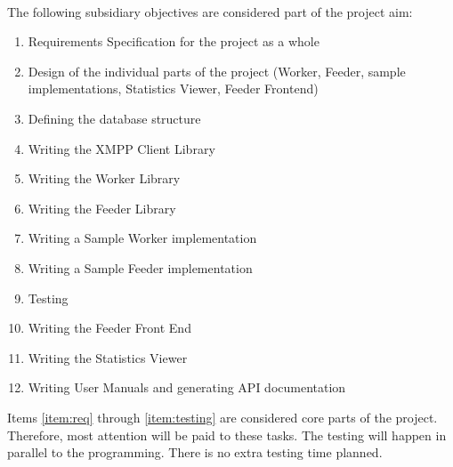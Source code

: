 \paragraph{}
The following subsidiary objectives are considered part of the project aim:
\begin{enumerate}
\item \label{item:req} Requirements Specification for the project as a whole
\item \label{item:design} Design of the individual parts of the project (Worker, Feeder, sample implementations, Statistics Viewer, Feeder Frontend)
\item \label{item:db} Defining the database structure
\item \label{item:client} Writing the XMPP Client Library
\item \label{item:worker} Writing the Worker Library
\item \label{item:feeder} Writing the Feeder Library
\item \label{item:samplF} Writing a Sample Worker implementation
\item \label{item:samplW} Writing a Sample Feeder implementation
\item \label{item:testing} Testing
\item \label{item:frontend} Writing the Feeder Front End
\item \label{item:viewer} Writing the Statistics Viewer
\item \label{item:manual} Writing User Manuals and generating API documentation
\end{enumerate}
Items \ref{item:req} through \ref{item:testing} are considered core parts of the project. Therefore, most attention will be paid to these tasks. The testing will happen in parallel to the programming. There is no extra testing time planned.

